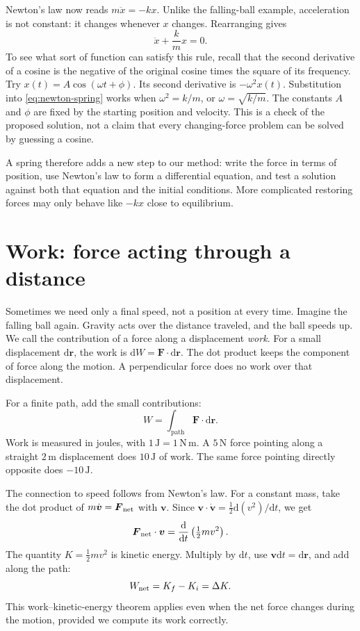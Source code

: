 \documentclass[11pt,oneside]{book}
\newcommand{\dd}{\mathrm{d}}
\newcommand{\vect}[1]{\boldsymbol{#1}}
\newcommand{\od}[2]{\frac{\dd #1}{\dd #2}}
\theoremstyle{reviewstyle}
\begin{document}
Newton's law now reads $m\ddot x=-kx$. Unlike the falling-ball example, acceleration is not constant: it changes whenever $x$ changes. Rearranging gives
\begin{equation}
\ddot x+\frac{k}{m}x=0.
\label{eq:newton-spring}
\end{equation}
To see what sort of function can satisfy this rule, recall that the second derivative of a cosine is the negative of the original cosine times the square of its frequency. Try $x(t)=A\cos(\omega t+\phi)$. Its second derivative is $-\omega^2x(t)$. Substitution into \eqref{eq:newton-spring} works when $\omega^2=k/m$, or $\omega=\sqrt{k/m}$. The constants $A$ and $\phi$ are fixed by the starting position and velocity. This is a check of the proposed solution, not a claim that every changing-force problem can be solved by guessing a cosine.

A spring therefore adds a new step to our method: write the force in terms of position, use Newton's law to form a differential equation, and test a solution against both that equation and the initial conditions. More complicated restoring forces may only behave like $-kx$ close to equilibrium.

\section{Work: force acting through a distance}
Sometimes we need only a final speed, not a position at every time. Imagine the falling ball again. Gravity acts over the distance traveled, and the ball speeds up. We call the contribution of a force along a displacement \emph{work}. For a small displacement $\dd\vect r$, the work is $\dd W=\vect F\cdot\dd\vect r$. The dot product keeps the component of force along the motion. A perpendicular force does no work over that displacement.

For a finite path, add the small contributions:
\begin{equation}
W=\int_{\mathrm{path}}\vect F\cdot\dd\vect r.
\end{equation}
Work is measured in joules, with $1\,\mathrm J=1\,\mathrm{N\,m}$. A $5\,\mathrm N$ force pointing along a straight $2\,\mathrm m$ displacement does $10\,\mathrm J$ of work. The same force pointing directly opposite does $-10\,\mathrm J$.

The connection to speed follows from Newton's law. For a constant mass, take the dot product of $m\dot{\vect v}=\vect F_{\rm net}$ with $\vect v$. Since $\vect v\cdot\dot{\vect v}=\tfrac12\dd(v^2)/\dd t$, we get
\begin{equation}
\vect F_{\rm net}\cdot\vect v
=\od{}{t}\left(\tfrac12mv^2\right).
\end{equation}
The quantity $K=\tfrac12mv^2$ is kinetic energy. Multiply by $\dd t$, use $\vect v\dd t=\dd\vect r$, and add along the path:
\begin{equation}
W_{\rm net}=K_f-K_i=\Delta K.
\label{eq:work-kinetic}
\end{equation}
This work--kinetic-energy theorem applies even when the net force changes during the motion, provided we compute its work correctly.
\end{document}
